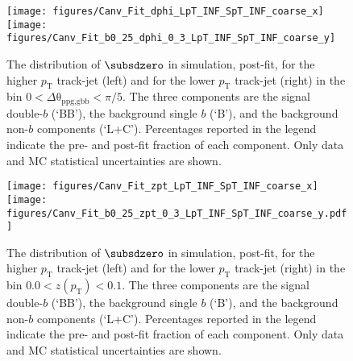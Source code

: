 \documentclass[PAPER, atlasdraft=true, texlive=2016, UKenglish,coverpage]{\ATLASLATEXPATH atlasdoc}
\begin{document}

\printbibliography
%
%



\clearpage

\begin{figure}[htbp]
  \centering
 \texttt{[image: figures/Canv\_Fit\_dphi\_LpT\_INF\_SpT\_INF\_coarse\_x]}
 \texttt{[image: figures/Canv\_Fit\_b0\_25\_dphi\_0\_3\_LpT\_INF\_SpT\_INF\_coarse\_y]}\\
\caption{The distribution of $\subsdzero$ in simulation, post-fit, for the higher $p_\text{T}$ track-jet (left) and for the lower $p_\text{T}$ track-jet (right) in the bin $0<\Delta\mathrm{\theta}_\text{ppg,gbb}<\pi/5$. The three components are the signal double-$b$ (`BB'), the background single $b$ (`B'), and the background non-$b$ components (`L+C').  Percentages reported in the legend indicate the pre- and post-fit fraction of each component.  Only data and MC statistical uncertainties are shown.}
  \label{fig:fits2}
\end{figure}

\begin{figure}[htbp]
  \centering
 \texttt{[image: figures/Canv\_Fit\_zpt\_LpT\_INF\_SpT\_INF\_coarse\_x]}
 \texttt{[image: figures/Canv\_Fit\_b0\_25\_zpt\_0\_3\_LpT\_INF\_SpT\_INF\_coarse\_y.pdf]}\\
\caption{The distribution of $\subsdzero$ in simulation, post-fit, for the higher $p_\text{T}$ track-jet (left) and for the lower $p_\text{T}$ track-jet (right) in the bin $0.0<z(p_\text{T})<0.1$. The three components are the signal double-$b$ (`BB'), the background single $b$ (`B'), and the background non-$b$ components (`L+C').  Percentages reported in the legend indicate the pre- and post-fit fraction of each component.  Only data and MC statistical uncertainties are shown.}
  \label{fig:fits3}
\end{figure}
\end{document}
